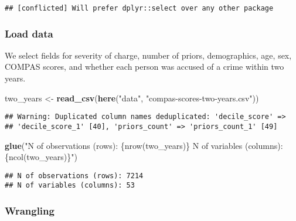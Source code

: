 \documentclass[
]{book}
\newenvironment{Shaded}{\begin{snugshade}}{\end{snugshade}}
\newcommand{\KeywordTok}[1]{\textcolor[rgb]{0.13,0.29,0.53}{\textbf{#1}}}
\newcommand{\NormalTok}[1]{#1}
\newcommand{\StringTok}[1]{\textcolor[rgb]{0.31,0.60,0.02}{#1}}
\begin{document}
\begin{verbatim}
## [conflicted] Will prefer dplyr::select over any other package
\end{verbatim}

\hypertarget{load-data}{%
\subsubsection{Load data}\label{load-data}}

We select fields for severity of charge, number of priors, demographics, age, sex, COMPAS scores, and whether each person was accused of a crime within two years.

\begin{Shaded}
\begin{Highlighting}[]
\NormalTok{two\_years \textless{}{-}}\StringTok{ }\KeywordTok{read\_csv}\NormalTok{(}\KeywordTok{here}\NormalTok{(}\StringTok{"data"}\NormalTok{, }\StringTok{"compas{-}scores{-}two{-}years.csv"}\NormalTok{))}
\end{Highlighting}
\end{Shaded}

\begin{verbatim}
## Warning: Duplicated column names deduplicated: 'decile_score' =>
## 'decile_score_1' [40], 'priors_count' => 'priors_count_1' [49]
\end{verbatim}

\begin{Shaded}
\begin{Highlighting}[]
\KeywordTok{glue}\NormalTok{(}\StringTok{"N of observations (rows): \{nrow(two\_years)\}}
\StringTok{      N of variables (columns): \{ncol(two\_years)\}"}\NormalTok{)}
\end{Highlighting}
\end{Shaded}

\begin{verbatim}
## N of observations (rows): 7214
## N of variables (columns): 53
\end{verbatim}

\hypertarget{wrangling}{%
\subsubsection{Wrangling}\label{wrangling}}
\end{document}
